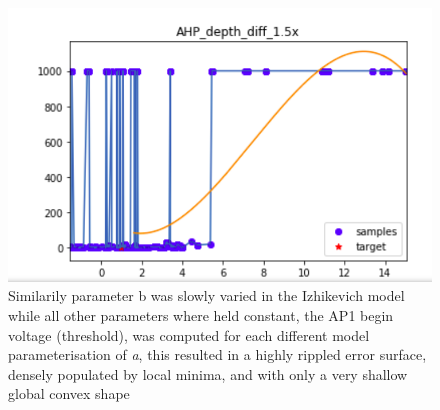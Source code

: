 \begin{figure}
      \centering
      \includegraphics[scale=0.85]{figures/parameter_b_hopeless_surface2.png}
      \caption[Cross section of difficult or hopeless error surface]{Similarily parameter b was slowly varied in the Izhikevich model while all other parameters where held constant, the AP1 begin voltage (threshold), was computed for each different model parameterisation of \emph{a}, this resulted in a highly rippled error surface, densely populated by local minima, and with only a very shallow global convex shape}
      \label{fig:discontinuous_constraint}
\end{figure}


